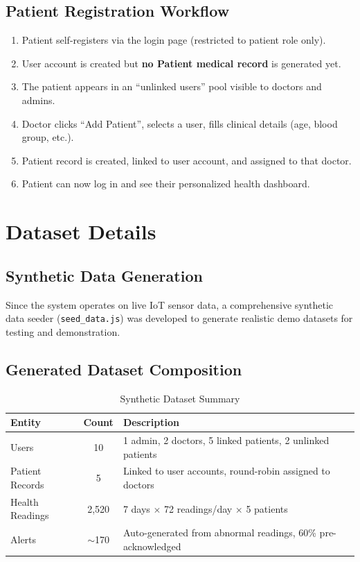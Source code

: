 \documentclass[12pt,a4paper]{report}
\begin{document}
\section{Patient Registration Workflow}
\begin{enumerate}[leftmargin=*]
    \item Patient self-registers via the login page (restricted to patient role only).
    \item User account is created but \textbf{no Patient medical record} is generated yet.
    \item The patient appears in an ``unlinked users'' pool visible to doctors and admins.
    \item Doctor clicks ``Add Patient'', selects a user, fills clinical details (age, blood group, etc.).
    \item Patient record is created, linked to user account, and assigned to that doctor.
    \item Patient can now log in and see their personalized health dashboard.
\end{enumerate}

\chapter{Dataset Details}

\section{Synthetic Data Generation}
Since the system operates on live IoT sensor data, a comprehensive synthetic data seeder (\texttt{seed\_data.js}) was developed to generate realistic demo datasets for testing and demonstration.

\section{Generated Dataset Composition}

\begin{table}[H]
\centering
\caption{Synthetic Dataset Summary}
\label{tab:dataset}
\begin{tabular}{|l|c|p{6cm}|}
\hline
\textbf{Entity} & \textbf{Count} & \textbf{Description} \\
\hline
Users & 10 & 1 admin, 2 doctors, 5 linked patients, 2 unlinked patients \\
\hline
Patient Records & 5 & Linked to user accounts, round-robin assigned to doctors \\
\hline
Health Readings & 2,520 & 7 days $\times$ 72 readings/day $\times$ 5 patients \\
\hline
Alerts & $\sim$170 & Auto-generated from abnormal readings, 60\% pre-acknowledged \\
\hline
\end{tabular}
\end{table}
\end{document}
